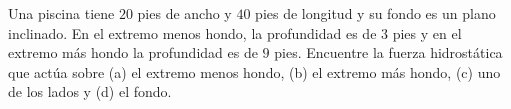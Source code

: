 \item Una piscina tiene $20$ pies de ancho y $40$ pies de longitud y su fondo es un plano inclinado. En el extremo menos hondo, la profundidad es de $3$ pies y en el extremo más hondo la profundidad es de $9$ pies. Encuentre la fuerza hidrostática que actúa sobre (a) el extremo menos hondo, (b) el extremo más hondo, (c) uno de los lados y (d) el fondo.

